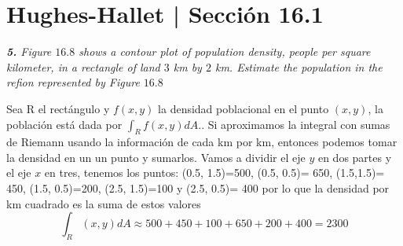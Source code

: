 \documentclass[a4paper,12pt]{article}
\begin{document}
	\section{Hughes-Hallet | Sección 16.1}
	\textit{\textbf{5.} Figure $16.8$ shows a contour plot of population density, people per square kilometer, in a rectangle of land $3$ km by $2$ km. Estimate the population in the refion represented by Figure $16.8$}

Sea R el rectángulo y $f(x,y)$ la densidad poblacional en el punto $(x,y)$, la población está dada por $\int_{R}f(x,y)dA$.. Si aproximamos la integral con sumas de Riemann usando la información de cada km por km, entonces podemos tomar la densidad en un un punto y sumarlos.
Vamos a dividir el eje $y$ en dos partes y el eje $x$ en tres, tenemos los puntos:
(0.5, 1.5)=500, (0.5, 0.5)= 650, (1.5,1.5)= 450, (1.5, 0.5)=200, (2.5, 1.5)=100 y (2.5, 0.5)= 400
por lo que la densidad por km cuadrado es la suma de estos valores
\[\int_{R}(x,y)dA\approx 500 + 450 + 100 + 650 + 200 + 400 = 2300\]
\end{document}
